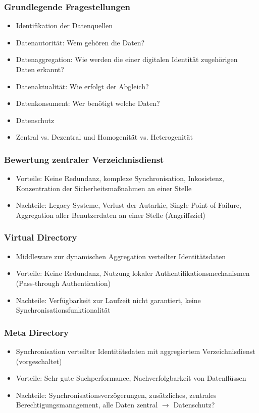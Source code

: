 \subsubsection{Grundlegende Fragestellungen}
\begin{itemize}
	\item Identifikation der Datenquellen
	\item Datenautorität: Wem gehören die Daten?
	\item Datenaggregation: Wie werden die einer digitalen Identität zugehörigen Daten erkannt?
	\item Datenaktualität: Wie erfolgt der Abgleich?
	\item Datenkonsument: Wer benötigt welche Daten?
	\item Datenschutz
	\item Zentral vs. Dezentral und Homogenität vs. Heterogenität
\end{itemize}

\subsubsection{Bewertung zentraler Verzeichnisdienst}
\begin{itemize}
	\item Vorteile: Keine {Redundanz, komplexe Synchronisation, Inkosistenz}, Konzentration der Sicherheitsmaßnahmen an einer Stelle
	\item Nachteile: Legacy Systeme, Verlust der Autarkie, Single Point of Failure, Aggregation aller Benutzerdaten an einer Stelle (Angriffsziel)
\end{itemize}

\subsubsection{Virtual Directory}
\begin{itemize}
	\item Middleware zur dynamischen Aggregation verteilter Identitätsdaten
	\item Vorteile: Keine Redundanz, Nutzung lokaler Authentifikationsmechanismen (Pass-through Authentication)
	\item Nachteile: Verfügbarkeit zur Laufzeit nicht garantiert, keine Synchronisationsfunktionalität
\end{itemize}

\subsubsection{Meta Directory}
\begin{itemize}
	\item Synchronisation verteilter Identitätsdaten mit aggregiertem Verzeichnisdienst (vorgeschaltet)
	\item Vorteile: Sehr gute Suchperformance, Nachverfolgbarkeit von Datenflüssen
	\item Nachteile: Synchronisationsverzögerungen, zusätzliches, zentrales Berechtigungsmanagement, alle Daten zentral $\rightarrow$ Datenschutz?
\end{itemize}

